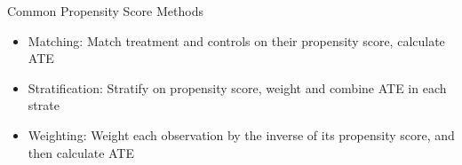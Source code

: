 \begin{frame}{Common Propensity Score Methods}
\begin{itemize}
 \item Matching: Match treatment and controls on their propensity score, calculate ATE
 \item Stratification: Stratify on propensity score, weight and combine ATE in each strate
 \item Weighting: Weight each observation by the inverse of its propensity score, and then calculate ATE
\end{itemize}

 
\end{frame}
